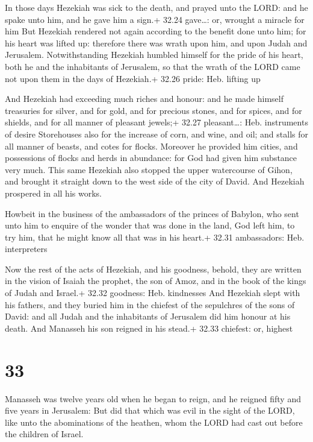  In those days Hezekiah was sick to the death, and prayed
unto the LORD: and he spake unto him, and he gave him a sign.+ 32.24
gave\ldots: or, wrought a miracle for him  But Hezekiah
rendered not again according to the benefit done unto him; for his heart
was lifted up: therefore there was wrath upon him, and upon Judah and
Jerusalem.  Notwithstanding Hezekiah humbled himself for
the pride of his heart, both he and the inhabitants of Jerusalem, so
that the wrath of the LORD came not upon them in the days of Hezekiah.+
32.26 pride: Heb. lifting up

 And Hezekiah had exceeding much riches and honour: and
he made himself treasuries for silver, and for gold, and for precious
stones, and for spices, and for shields, and for all manner of pleasant
jewels;+ 32.27 pleasant\ldots: Heb. instruments of desire 
Storehouses also for the increase of corn, and wine, and oil; and stalls
for all manner of beasts, and cotes for flocks.  Moreover
he provided him cities, and possessions of flocks and herds in
abundance: for God had given him substance very much.  This
same Hezekiah also stopped the upper watercourse of Gihon, and brought
it straight down to the west side of the city of David. And Hezekiah
prospered in all his works.

 Howbeit in the business of the ambassadors of the
princes of Babylon, who sent unto him to enquire of the wonder that was
done in the land, God left him, to try him, that he might know all that
was in his heart.+ 32.31 ambassadors: Heb. interpreters

 Now the rest of the acts of Hezekiah, and his goodness,
behold, they are written in the vision of Isaiah the prophet, the son of
Amoz, and in the book of the kings of Judah and Israel.+ 32.32 goodness:
Heb. kindnesses  And Hezekiah slept with his fathers, and
they buried him in the chiefest of the sepulchres of the sons of David:
and all Judah and the inhabitants of Jerusalem did him honour at his
death. And Manasseh his son reigned in his stead.+ 32.33 chiefest: or,
highest

\hypertarget{section-32}{%
\section{33}\label{section-32}}

 Manasseh was twelve years old when he began to reign, and
he reigned fifty and five years in Jerusalem:  But did that
which was evil in the sight of the LORD, like unto the abominations of
the heathen, whom the LORD had cast out before the children of Israel.

